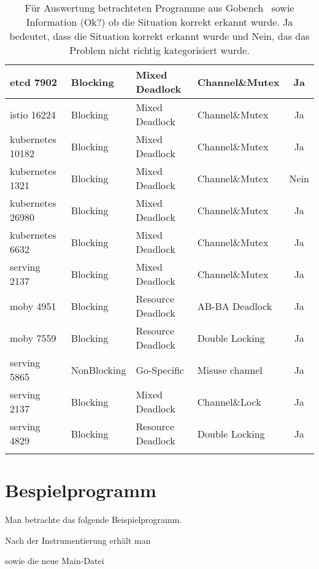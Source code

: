 \begin{longtable}[c]{|l|l|l|l|c|}
  etcd 7902            & Blocking      & Mixed Deadlock         & Channel\&Mutex         & Ja                                   \\ \hline
  istio 16224           & Blocking      & Mixed Deadlock         & Channel\&Mutex         & Ja                                   \\ \hline
  kubernetes 10182           & Blocking      & Mixed Deadlock         & Channel\&Mutex         & Ja                                   \\ \hline
  kubernetes 1321            & Blocking      & Mixed Deadlock         & Channel\&Mutex         & Nein                                 \\ \hline
  kubernetes 26980           & Blocking      & Mixed Deadlock         & Channel\&Mutex         & Ja                                   \\ \hline
  kubernetes 6632            & Blocking      & Mixed Deadlock         & Channel\&Mutex         & Ja                                   \\ \hline
  serving 2137            & Blocking      & Mixed Deadlock         & Channel\&Mutex         & Ja                                   \\ \hline
  moby 4951            & Blocking      & Resource Deadlock      & AB-BA Deadlock         & Ja                                   \\ \hline
  moby 7559            & Blocking      & Resource Deadlock      & Double Locking         & Ja                                   \\ \hline
  serving 5865            & NonBlocking   & Go-Specific            & Misuse channel         & Ja                                   \\ \hline
  serving 2137            & Blocking      & Mixed Deadlock         & Channel\&Lock          & Ja                                   \\ \hline
  serving 4829            & Blocking      & Resource Deadlock      & Double Locking         & Ja                                   \\ \hline
  \caption{Für Auswertung betrachteten 
  Programme aus Gobench~\cite{gobench} sowie 
  Information (Ok?) ob die Situation korrekt erkannt wurde. Ja bedeutet, dass 
  die Situation korrekt erkannt wurde
  und Nein, das das Problem nicht richtig kategorisiert wurde.}
  \label{App-Goker}
  \end{longtable}


\chapter{Bespielprogramm}\label{Appendix-2}
Man betrachte das folgende Beispielprogramm.
  
Nach der Instrumentierung erhält man

sowie die neue Main-Datei


